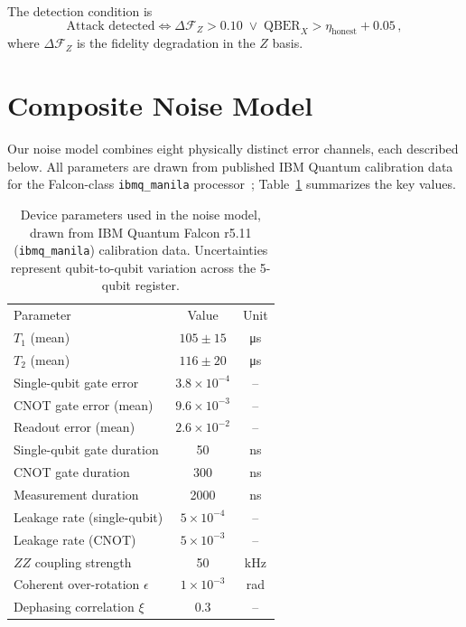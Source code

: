 \documentclass[aip, amsmath, amssymb, preprint, longbibliography]{revtex4-2}
\newcommand{\qber}{\text{QBER}}
\newcommand{\fid}{\mathcal{F}}
\begin{document}
The detection condition is
\begin{equation}
\text{Attack detected} \iff
\Delta\fid_Z > 0.10 \;\lor\; \qber_X > \eta_{\text{honest}} + 0.05\,,
\label{eq:detection}
\end{equation}
where $\Delta\fid_Z$ is the fidelity degradation in the $Z$ basis.

\section{Composite Noise Model}\label{sec:noise}

Our noise model combines eight physically distinct error channels, each
described below. All parameters are drawn from published IBM Quantum
calibration data for the Falcon-class \texttt{ibmq\_manila}
processor~\cite{Gambetta2017,Krantz2019}; Table~\ref{tab:params}
summarizes the key values.

\begin{table}[H]
\caption{\label{tab:params}Device parameters used in the noise model,
drawn from IBM Quantum Falcon r5.11 (\texttt{ibmq\_manila}) calibration
data. Uncertainties represent qubit-to-qubit variation across the 5-qubit
register.}
\begin{ruledtabular}
\begin{tabular}{lcc}
\textrm{Parameter} & \textrm{Value} & \textrm{Unit} \\
\colrule
$T_1$ (mean)                     & $105\pm15$   & \si{\micro\second} \\
$T_2$ (mean)                     & $116\pm20$   & \si{\micro\second} \\
Single-qubit gate error          & $3.8\times10^{-4}$ & -- \\
CNOT gate error (mean)           & $9.6\times10^{-3}$ & -- \\
Readout error (mean)             & $2.6\times10^{-2}$ & -- \\
Single-qubit gate duration       & \num{50}     & \si{ns} \\
CNOT gate duration               & \num{300}    & \si{ns} \\
Measurement duration             & \num{2000}   & \si{ns} \\
Leakage rate (single-qubit)      & $5\times10^{-4}$ & -- \\
Leakage rate (CNOT)              & $5\times10^{-3}$ & -- \\
$ZZ$ coupling strength           & \num{50}     & \si{kHz} \\
Coherent over-rotation $\epsilon$& $1\times10^{-3}$ & rad \\
Dephasing correlation $\xi$      & \num{0.3}    & -- \\
\end{tabular}
\end{ruledtabular}
\end{table}
\end{document}
